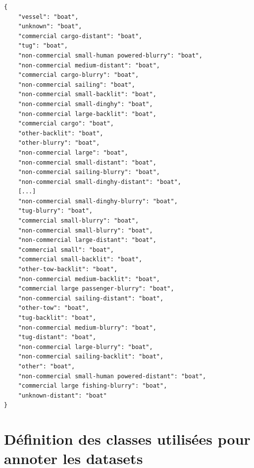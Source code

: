 \begin{verbatim}
{
    "vessel": "boat",
    "unknown": "boat",
    "commercial cargo-distant": "boat",
    "tug": "boat",
    "non-commercial small-human powered-blurry": "boat",
    "non-commercial medium-distant": "boat",
    "commercial cargo-blurry": "boat",
    "non-commercial sailing": "boat",
    "non-commercial small-backlit": "boat",
    "non-commercial small-dinghy": "boat",
    "non-commercial large-backlit": "boat",
    "commercial cargo": "boat",
    "other-backlit": "boat",
    "other-blurry": "boat",
    "non-commercial large": "boat",
    "non-commercial small-distant": "boat",
    "non-commercial sailing-blurry": "boat",
    "non-commercial small-dinghy-distant": "boat",
    [...]
    "non-commercial small-dinghy-blurry": "boat",
    "tug-blurry": "boat",
    "commercial small-blurry": "boat",
    "non-commercial small-blurry": "boat",
    "non-commercial large-distant": "boat",
    "commercial small": "boat",
    "commercial small-backlit": "boat",
    "other-tow-backlit": "boat",
    "non-commercial medium-backlit": "boat",
    "commercial large passenger-blurry": "boat",
    "non-commercial sailing-distant": "boat",
    "other-tow": "boat",
    "tug-backlit": "boat",
    "non-commercial medium-blurry": "boat",
    "tug-distant": "boat",
    "non-commercial large-blurry": "boat",
    "non-commercial sailing-backlit": "boat",
    "other": "boat",
    "non-commercial small-human powered-distant": "boat",
    "commercial large fishing-blurry": "boat",
    "unknown-distant": "boat"
}
\end{verbatim}
\label{ex_dictionnaire_conversion}

\pagebreak

\chapter{Définition des classes utilisées pour annoter les datasets}


